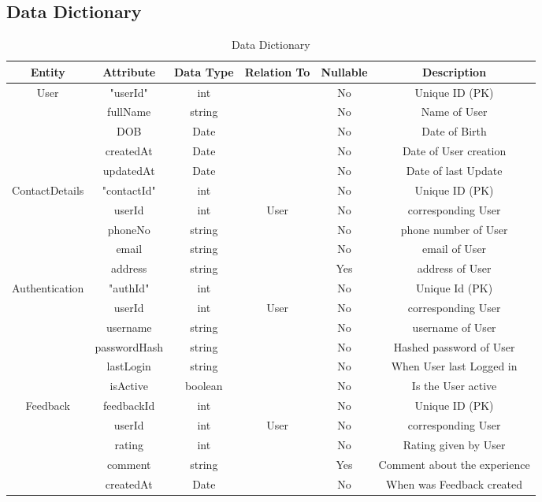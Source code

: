 \documentclass{FastFyp}
\begin{document}
\subsection{Data Dictionary}
\begin{table}[h!]
\centering
\caption{Data Dictionary}
\begin{tabular}{|c|c|c|c|c|c|}
\hline
\textbf{Entity} & \textbf{Attribute} & \textbf{Data Type} & \textbf{Relation To} & \textbf{Nullable} & \textbf{Description} \\
\hline
User & "userId" & int & & No & Unique ID (PK) \\
\hline
 & fullName & string & & No & Name of User \\
\hline
 & DOB & Date & & No & Date of Birth \\
\hline
 & createdAt & Date & & No & Date of User creation \\
\hline
 & updatedAt & Date & & No & Date of last Update \\
\hline
ContactDetails & "contactId" & int & & No & Unique ID (PK) \\
\hline
 & userId & int & User & No & corresponding User \\
\hline
 & phoneNo & string & & No & phone number of User \\
\hline
 & email & string & & No & email of User \\
\hline
 & address & string & & Yes & address of User\\
\hline
Authentication & "authId" & int & & No & Unique Id (PK)\\
\hline
 & userId & int & User & No & corresponding User \\
\hline
 & username & string & & No & username of User \\
\hline
 & passwordHash & string & & No & Hashed password of User \\
\hline
 & lastLogin & string & & No & When User last Logged in \\
\hline
 & isActive & boolean & & No & Is the User active \\
\hline
Feedback & feedbackId & int & & No & Unique ID (PK) \\
\hline
 & userId & int & User & No & corresponding User \\
\hline
 & rating & int & & No & Rating given by User \\
\hline
 & comment & string & & Yes & Comment about the experience \\
\hline
 & createdAt & Date & & No & When was Feedback created \\
\hline
\end{tabular}
\end{table}
\end{document}
